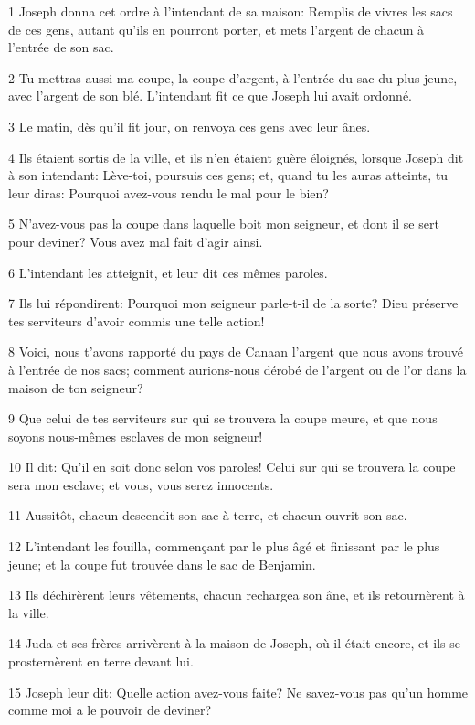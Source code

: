 \par 1 Joseph donna cet ordre à l'intendant de sa maison: Remplis de vivres les sacs de ces gens, autant qu'ils en pourront porter, et mets l'argent de chacun à l'entrée de son sac.
\par 2 Tu mettras aussi ma coupe, la coupe d'argent, à l'entrée du sac du plus jeune, avec l'argent de son blé. L'intendant fit ce que Joseph lui avait ordonné.
\par 3 Le matin, dès qu'il fit jour, on renvoya ces gens avec leur ânes.
\par 4 Ils étaient sortis de la ville, et ils n'en étaient guère éloignés, lorsque Joseph dit à son intendant: Lève-toi, poursuis ces gens; et, quand tu les auras atteints, tu leur diras: Pourquoi avez-vous rendu le mal pour le bien?
\par 5 N'avez-vous pas la coupe dans laquelle boit mon seigneur, et dont il se sert pour deviner? Vous avez mal fait d'agir ainsi.
\par 6 L'intendant les atteignit, et leur dit ces mêmes paroles.
\par 7 Ils lui répondirent: Pourquoi mon seigneur parle-t-il de la sorte? Dieu préserve tes serviteurs d'avoir commis une telle action!
\par 8 Voici, nous t'avons rapporté du pays de Canaan l'argent que nous avons trouvé à l'entrée de nos sacs; comment aurions-nous dérobé de l'argent ou de l'or dans la maison de ton seigneur?
\par 9 Que celui de tes serviteurs sur qui se trouvera la coupe meure, et que nous soyons nous-mêmes esclaves de mon seigneur!
\par 10 Il dit: Qu'il en soit donc selon vos paroles! Celui sur qui se trouvera la coupe sera mon esclave; et vous, vous serez innocents.
\par 11 Aussitôt, chacun descendit son sac à terre, et chacun ouvrit son sac.
\par 12 L'intendant les fouilla, commençant par le plus âgé et finissant par le plus jeune; et la coupe fut trouvée dans le sac de Benjamin.
\par 13 Ils déchirèrent leurs vêtements, chacun rechargea son âne, et ils retournèrent à la ville.
\par 14 Juda et ses frères arrivèrent à la maison de Joseph, où il était encore, et ils se prosternèrent en terre devant lui.
\par 15 Joseph leur dit: Quelle action avez-vous faite? Ne savez-vous pas qu'un homme comme moi a le pouvoir de deviner?

